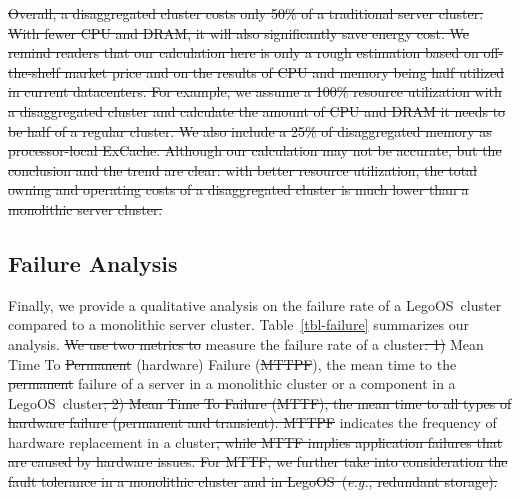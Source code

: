 \documentclass[10pt,times,twocolumn]{z2-article}
\newcommand{\eg}{\textit{e.g.}}
\newcommand{\lego}{LegoOS}
\newcommand{\excache}{ExCache}
\providecommand{\DIFaddtex}[1]{{\protect\color{blue}\uwave{#1}}} %
\providecommand{\DIFdeltex}[1]{{\protect\color{red}\sout{#1}}}                      %
\providecommand{\DIFaddbegin}{} %
\providecommand{\DIFaddend}{} %
\providecommand{\DIFdelbegin}{} %
\providecommand{\DIFdelend}{} %
\providecommand{\DIFadd}[1]{\texorpdfstring{\DIFaddtex{#1}}{#1}} %
\providecommand{\DIFdel}[1]{\texorpdfstring{\DIFdeltex{#1}}{}} %
\newcommand{\DIFscaledelfig}{0.5}
\newlength{\DIFdelgraphicswidth} %
\newlength{\DIFdelgraphicsheight} %
\newcommand{\DIFaddincludegraphics}[2][]{{\color{blue}\fbox{\DIFOincludegraphics[#1]{#2}}}} %
\newcommand{\DIFdelincludegraphics}[2][]{%
\sbox{\DIFdelgraphicsbox}{\DIFOincludegraphics[#1]{#2}}%
\settoboxwidth{\DIFdelgraphicswidth}{\DIFdelgraphicsbox} %
\settoboxtotalheight{\DIFdelgraphicsheight}{\DIFdelgraphicsbox} %
\scalebox{\DIFscaledelfig}{%
\parbox[b]{\DIFdelgraphicswidth}{\usebox{\DIFdelgraphicsbox}\\[-\baselineskip] \rule{\DIFdelgraphicswidth}{0em}}\llap{\resizebox{\DIFdelgraphicswidth}{\DIFdelgraphicsheight}{%
\setlength{\unitlength}{\DIFdelgraphicswidth}%
\begin{picture}(1,1)%
\thicklines\linethickness{2pt} %
{\color[rgb]{1,0,0}\put(0,0){\framebox(1,1){}}}%
{\color[rgb]{1,0,0}\put(0,0){\line( 1,1){1}}}%
{\color[rgb]{1,0,0}\put(0,1){\line(1,-1){1}}}%
\end{picture}%
}\hspace*{3pt}}} %
} %
\DeclareRobustCommand{\DIFaddbegin}{\DIFOaddbegin \let\includegraphics\DIFaddincludegraphics} %
\DeclareRobustCommand{\DIFaddend}{\DIFOaddend \let\includegraphics\DIFOincludegraphics} %
\DeclareRobustCommand{\DIFdelbegin}{\DIFOdelbegin \let\includegraphics\DIFdelincludegraphics} %
\DeclareRobustCommand{\DIFdelend}{\DIFOaddend \let\includegraphics\DIFOincludegraphics} %
\begin{document}
{{{{{{{%
\DIFdel{Overall, a disaggregated cluster costs only 50\% of a traditional server cluster.
With fewer CPU and DRAM, it will also significantly save energy cost.
We remind readers that our calculation here is only a rough estimation based on off-the-shelf market price
and on the results of CPU and memory being half utilized in current datacenters.
For example, we assume a 100\% resource utilization with a disaggregated cluster
and calculate the amount of CPU and DRAM it needs to be half of a regular cluster.
We also include a 25\% of disaggregated memory as processor-local \excache.
Although our calculation may not be accurate, but the conclusion and the trend are clear:
with better resource utilization, the total owning and operating costs of a disaggregated cluster is much lower than a monolithic server cluster. 
}\DIFdelend \fi

\subsection{Failure Analysis}
\label{sec:failure-results}
Finally, we provide a qualitative analysis on the failure rate of a \lego\ cluster compared to a monolithic server cluster.
Table~\ref{tbl-failure} summarizes our analysis.
\DIFdelbegin \DIFdel{We use two metrics to }\DIFdelend \DIFaddbegin \DIFadd{To }\DIFaddend measure the failure rate of a cluster\DIFdelbegin \DIFdel{: 
1) }\DIFdelend \DIFaddbegin \DIFadd{, we use the metrics }\DIFaddend Mean Time To \DIFdelbegin \DIFdel{Permanent }\DIFdelend (hardware) Failure (\DIFdelbegin \DIFdel{MTTPF}\DIFdelend \DIFaddbegin \DIFadd{MTTF}\DIFaddend ), 
the mean time to the \DIFdelbegin \DIFdel{permanent }\DIFdelend failure of a server in a monolithic cluster
or a component in a \lego\ cluster\DIFdelbegin \DIFdel{;
2) Mean Time To Failure (MTTF), the mean time to all types of hardware failure (permanent and transient).
MTTPF }\DIFdelend \DIFaddbegin \DIFadd{.
MTTF }\DIFaddend indicates the frequency of hardware replacement in a cluster\DIFdelbegin \DIFdel{, 
while MTTF implies application failures that are caused by hardware issues.
For MTTF, we further take into consideration the fault tolerance in a monolithic cluster and in \lego\ (\eg, redundant storage).
}\DIFdelend \DIFaddbegin \DIFadd{.
}\DIFaddend 

}}}}}}}
\end{document}
